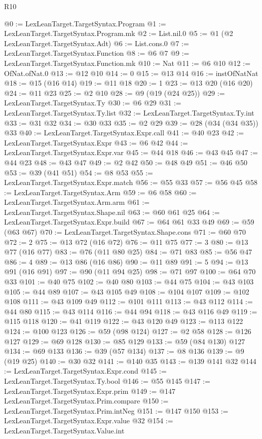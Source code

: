 \begin{lexlean}{R10}
\begin{coremodule}
@0 := LexLeanTarget.TargetSyntax.Program
@1 := LexLeanTarget.TargetSyntax.Program.mk
@2 := List.nil.{0}
@5 := @1 (@2 LexLeanTarget.TargetSyntax.Adt)
@6 := List.cons.{0}
@7 := LexLeanTarget.TargetSyntax.Function
@8 := @6 @7
@9 := LexLeanTarget.TargetSyntax.Function.mk
@10 := Nat
@11 := @6 @10
@12 := OfNat.ofNat.{0}
@13 := @12 @10
@14 := 0
@15 := @13 @14
@16 := instOfNatNat
@18 := @15 (@16 @14)
@19 := @11 @18
@20 := 1
@23 := @13 @20 (@16 @20)
@24 := @11 @23
@25 := @2 @10
@28 := @9 (@19 (@24 @25))
@29 := LexLeanTarget.TargetSyntax.Ty
@30 := @6 @29
@31 := LexLeanTarget.TargetSyntax.Ty.list
@32 := LexLeanTarget.TargetSyntax.Ty.int
@33 := @31 @32
@34 := @30 @33
@35 := @2 @29
@39 := @28 (@34 (@34 @35)) @33
@40 := LexLeanTarget.TargetSyntax.Expr.call
@41 := @40 @23
@42 := LexLeanTarget.TargetSyntax.Expr
@43 := @6 @42
@44 := LexLeanTarget.TargetSyntax.Expr.var
@45 := @44 @18
@46 := @43 @45
@47 := @44 @23
@48 := @43 @47
@49 := @2 @42
@50 := @48 @49
@51 := @46 @50
@53 := @39 (@41 @51)
@54 := @8 @53
@55 := LexLeanTarget.TargetSyntax.Expr.match
@56 := @55 @33
@57 := @56 @45
@58 := LexLeanTarget.TargetSyntax.Arm
@59 := @6 @58
@60 := LexLeanTarget.TargetSyntax.Arm.arm
@61 := LexLeanTarget.TargetSyntax.Shape.nil
@63 := @60 @61 @25
@64 := LexLeanTarget.TargetSyntax.Expr.build
@67 := @64 @61 @33 @49
@69 := @59 (@63 @67)
@70 := LexLeanTarget.TargetSyntax.Shape.cons
@71 := @60 @70
@72 := 2
@75 := @13 @72 (@16 @72)
@76 := @11 @75
@77 := 3
@80 := @13 @77 (@16 @77)
@83 := @76 (@11 @80 @25)
@84 := @71 @83
@85 := @56 @47
@86 := 4
@89 := @13 @86 (@16 @86)
@90 := @11 @89
@91 := 5
@94 := @13 @91 (@16 @91)
@97 := @90 (@11 @94 @25)
@98 := @71 @97
@100 := @64 @70 @33
@101 := @40 @75
@102 := @40 @80
@103 := @44 @75
@104 := @43 @103
@105 := @44 @89
@107 := @43 @105 @49
@108 := @104 @107
@109 := @102 @108
@111 := @43 @109 @49
@112 := @101 @111
@113 := @43 @112
@114 := @44 @80
@115 := @43 @114
@116 := @44 @94
@118 := @43 @116 @49
@119 := @115 @118
@120 := @41 @119
@122 := @43 @120 @49
@123 := @113 @122
@124 := @100 @123
@126 := @59 (@98 @124)
@127 := @2 @58
@128 := @126 @127
@129 := @69 @128
@130 := @85 @129
@133 := @59 (@84 @130) @127
@134 := @69 @133
@136 := @39 (@57 @134)
@137 := @8 @136
@139 := @9 (@19 @25)
@140 := @30 @32
@141 := @140 @35
@143 := @139 @141 @32
@144 := LexLeanTarget.TargetSyntax.Expr.cond
@145 := LexLeanTarget.TargetSyntax.Ty.bool
@146 := @55 @145
@147 := LexLeanTarget.TargetSyntax.Expr.prim
@149 := @147 LexLeanTarget.TargetSyntax.Prim.compare
@150 := LexLeanTarget.TargetSyntax.Prim.intNeg
@151 := @147 @150
@153 := LexLeanTarget.TargetSyntax.Expr.value @32
@154 := LexLeanTarget.TargetSyntax.Value.int

\end{coremodule}
\end{lexlean}
